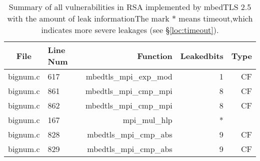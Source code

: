 \begin{table*}%
\centering
\caption{Summary of all vulnerabilities in RSA implemented by mbedTLS 2.5 with the amount of leak informationThe mark $*$ means timeout,which indicates more severe leakages (see \S\ref{loc:timeout}).}\label{tab:RSAmbedTLS}
\begin{tabular}{clrrr}
\hline
\textbf{File} & \textbf{Line Num} & \textbf{Function} & \textbf{Leakedbits} & \textbf{Type} \\\hline
bignum.c&617&mbedtls\_mpi\_exp\_mod&1 &CF\\
bignum.c&861&mbedtls\_mpi\_cmp\_mpi&8 &CF\\
bignum.c&862&mbedtls\_mpi\_cmp\_mpi&8 &CF\\
bignum.c&167&mpi\_mul\_hlp&*&\\
bignum.c&828&mbedtls\_mpi\_cmp\_abs&9 &CF\\
bignum.c&829&mbedtls\_mpi\_cmp\_abs&9 &CF\\
\hline
\end{tabular}
\end{table*}
